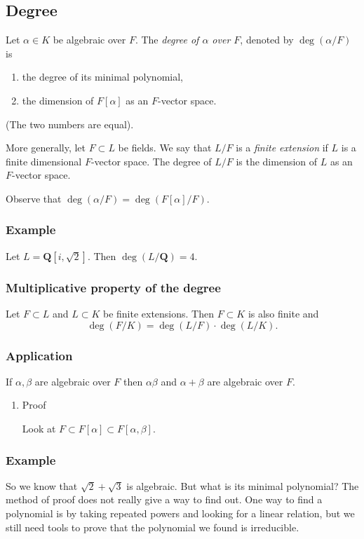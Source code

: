 \documentclass[11pt]{article}
\begin{document}
\subsection{Degree}
\label{sec:orgd575131}
Let \(\alpha \in K\) be algebraic over \(F\).
The \emph{degree of \(\alpha\) over \(F\)}, denoted by \(\deg(\alpha/F)\) is
\begin{enumerate}
\item the degree of its minimal polynomial,
\item the dimension of \(F[\alpha]\) as an \(F\)-vector space.
\end{enumerate}
(The two numbers are equal).

More generally, let \(F \subset L\) be fields.
We say that \(L/F\) is a \emph{finite extension} if \(L\) is a finite dimensional \(F\)-vector space.
The degree of \(L/F\) is the dimension of \(L\) as an \(F\)-vector space.

Observe that \(\deg(\alpha/F) = \deg(F[\alpha]/F)\).
\subsubsection{Example}
\label{sec:org52fb652}
Let \(L = \mathbf{Q}[i, \sqrt 2]\).
Then \(\deg (L / \mathbf{Q}) = 4\).
\subsubsection{Multiplicative property of the degree}
\label{sec:org55f8cdc}
Let \(F \subset L\) and \(L \subset K\) be finite extensions.
Then \(F \subset K\) is also finite and
\[ \deg(F/K) = \deg(L/F) \cdot \deg (L/K).\]
\subsubsection{Application}
\label{sec:orga45ccf9}
If \(\alpha, \beta\) are algebraic over \(F\) then \(\alpha\beta\) and \(\alpha+\beta\) are algebraic over \(F\).
\begin{enumerate}
\item Proof
\label{sec:org8a57abf}

Look at \(F \subset F[\alpha] \subset F[\alpha,\beta]\).
\end{enumerate}
\subsubsection{Example}
\label{sec:org2c3ea14}
So we know that \(\sqrt 2 + \sqrt 3\) is algebraic.
But what is its minimal polynomial?
The method of proof does not really give a way to find out.
One way to find a polynomial is by taking repeated powers and looking for a linear relation, but we still need tools to prove that the polynomial we found is irreducible.
\end{document}

